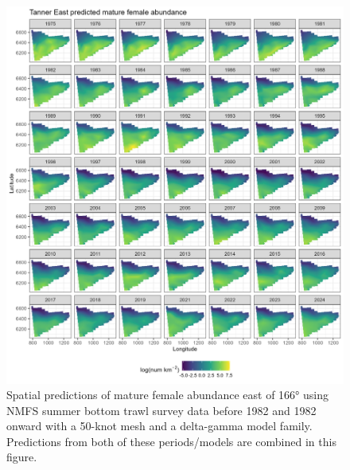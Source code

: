 \documentclass[
]{article}
\begin{document}
\begin{figure}

{\centering \includegraphics[width=1\linewidth,height=1\textheight]{../BAIRDI/Figures/TannerE_matfem_spatabund} 

}

\caption{Spatial predictions of mature female abundance east of 166° using NMFS summer bottom trawl survey data before 1982 and 1982 onward with a 50-knot mesh and a delta-gamma model family. Predictions from both of these periods/models are combined in this figure.}\label{fig:spatpred-abund-50-matfemE}
\end{figure}
\end{document}
